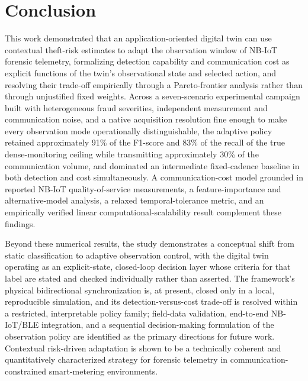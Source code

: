 \documentclass{ieeeaccess}
\begin{document}
\section{Conclusion}
\label{sec:Conclusion}
This work demonstrated that an application-oriented digital twin can use contextual theft-risk estimates to adapt the observation window of NB-IoT forensic telemetry, formalizing detection capability and communication cost as explicit functions of the twin's observational state and selected action, and resolving their trade-off empirically through a Pareto-frontier analysis rather than through unjustified fixed weights. Across a seven-scenario experimental campaign built with heterogeneous fraud severities, independent measurement and communication noise, and a native acquisition resolution fine enough to make every observation mode operationally distinguishable, the adaptive policy retained approximately 91\% of the F1-score and 83\% of the recall of the true dense-monitoring ceiling while transmitting approximately 30\% of the communication volume, and dominated an intermediate fixed-cadence baseline in both detection and cost simultaneously. A communication-cost model grounded in reported NB-IoT quality-of-service measurements, a feature-importance and alternative-model analysis, a relaxed temporal-tolerance metric, and an empirically verified linear computational-scalability result complement these findings.

Beyond these numerical results, the study demonstrates a conceptual shift from static classification to adaptive observation control, with the digital twin operating as an explicit-state, closed-loop decision layer whose criteria for that label are stated and checked individually rather than asserted. The framework's physical bidirectional synchronization is, at present, closed only in a local, reproducible simulation, and its detection-versus-cost trade-off is resolved within a restricted, interpretable policy family; field-data validation, end-to-end NB-IoT/BLE integration, and a sequential decision-making formulation of the observation policy are identified as the primary directions for future work. Contextual risk-driven adaptation is shown to be a technically coherent and quantitatively characterized strategy for forensic telemetry in communication-constrained smart-metering environments.
\end{document}
